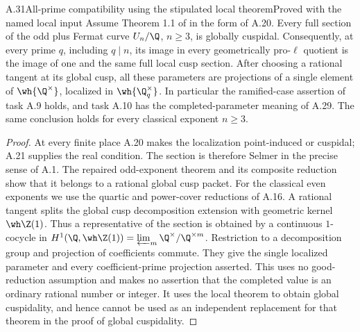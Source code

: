 \begin{statement}{A.31}{All-prime compatibility using the stipulated local theorem}{Proved with the named local input}
Assume Theorem 1.1 of \citet{OpenAILocal2026} in the form of A.20. Every full section of the odd plus Fermat curve $U_n/\Q$, $n\ge3$, is globally cuspidal. Consequently, at every prime $q$, including $q\mid n$, its image in every geometrically pro-$\ell$ quotient is the image of one and the same full local cusp section. After choosing a rational tangent at its global cusp, all these parameters are projections of a single element of $\wh{\Q^\times}$, localized in $\wh{\Q_q^\times}$. In particular the ramified-case assertion of task A.9 holds, and task A.10 has the completed-parameter meaning of A.29. The same conclusion holds for every classical exponent $n\ge3$.
\end{statement}
\begin{proof}
At every finite place A.20 makes the localization point-induced or cuspidal; A.21 supplies the real condition. The section is therefore Selmer in the precise sense of A.1. The repaired odd-exponent theorem and its composite reduction show that it belongs to a rational global cusp packet. For the classical even exponents we use the quartic and power-cover reductions of A.16. A rational tangent splits the global cusp decomposition extension with geometric kernel $\wh\Z(1)$. Thus a representative of the section is obtained by a continuous $1$-cocycle in $H^1(\Q,\wh\Z(1))=\varprojlim_m\Q^\times/\Q^{\times m}$. Restriction to a decomposition group and projection of coefficients commute. They give the single localized parameter and every coefficient-prime projection asserted. This uses no good-reduction assumption and makes no assertion that the completed value is an ordinary rational number or integer. It uses the local theorem to obtain global cuspidality, and hence cannot be used as an independent replacement for that theorem in the proof of global cuspidality.
\end{proof}

